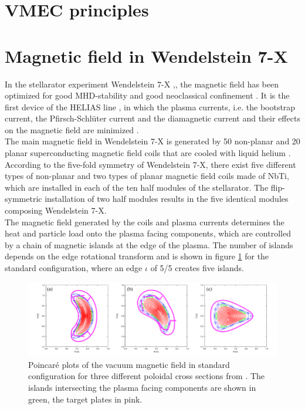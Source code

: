 \section{VMEC principles}

\section{Magnetic field in Wendelstein 7-X}
In the stellarator experiment Wendelstein 7-X \cite{Beidler1990},\cite{Klinger2013}, the magnetic field has been optimized for good MHD-stability and good neoclassical confinement \cite{Grieger1992}. It is the first device of the HELIAS line \cite{Nuhrenberg1986}, in which the plasma currents, i.e. the bootstrap current, the Pfirsch-Schlüter current and the diamagnetic current and their effects on the magnetic field are minimized \cite{Dinklage2018}.\\
The main magnetic field in Wendelstein 7-X is generated by 50 non-planar and 20 planar superconducting magnetic field coils that are cooled with liquid helium \cite{Rummel2012}. According to the five-fold symmetry of Wendelstein 7-X, there exist five different types of non-planar and two types of planar magnetic field coils made of NbTi, which are installed in each of the ten half modules of the stellarator. The flip-symmetric installation of two half modules results in the five identical modules composing Wendelstein 7-X. \\
The magnetic field generated by the coils and plasma currents determines the heat and particle load onto the plasma facing components, which are controlled by a chain of magnetic islands at the edge of the plasma. The number of islands depends on the edge rotational transform and is shown in figure \ref{fig:1} for the standard configuration, where an edge $\iota$ of 5/5 creates five islands.
\begin{figure}[!htb]
    \centering
    \includegraphics[width=\textwidth]{images/islands.png}
    \caption{Poincaré plots of the vacuum magnetic field in standard configuration for three different poloidal cross sections from \cite{Suzuki2016}. The islands intersecting the plasma facing components are shown in green, the target plates in pink.} \label{fig:1}
\end{figure}

